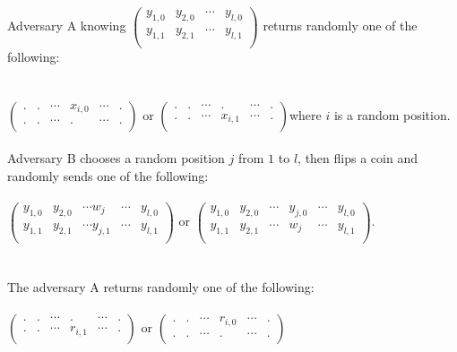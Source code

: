 \documentclass[oneside,a4paper,12pt]{book}
\begin{document}
Adversary A knowing  $\begin{pmatrix}
  y_{1,0} & y_{2,0} & \cdots & y_{l,0} \\
  y_{1,1} & y_{2,1} & \cdots & y_{l,1} \\
\end{pmatrix}$ returns randomly one of the following:\\\\\\$\begin{pmatrix}
  . & . & \cdots & x_{i,0}& \cdots & . \\
  . & . & \cdots & . & \cdots & . \\
\end{pmatrix}$ or $\begin{pmatrix}
  . & . & \cdots & . & \cdots & . \\
  . & . & \cdots & x_{i,1}& \cdots & . \\
\end{pmatrix}$where $i$ is a random position.\\\\

Adversary B chooses a random position $j$ from $1$ to $l$, then flips a coin and randomly sends one of the following:\\\\ $\begin{pmatrix}
  y_{1,0} & y_{2,0} & \cdots w_j& \cdots& y_{l,0} \\
  y_{1,1} & y_{2,1} & \cdots y_{j,1}& \cdots& y_{l,1} \\
\end{pmatrix}$ or  $\begin{pmatrix}
  y_{1,0} & y_{2,0} & \cdots & y_{j,0} & \cdots& y_{l,0} \\
  y_{1,1} & y_{2,1} & \cdots & w_j & \cdots& y_{l,1} \\
\end{pmatrix}$.\\\\\\
The adversary A returns randomly one of the following:\\\\$\begin{pmatrix}
  . & . & \cdots & . & \cdots & . \\
  . & . & \cdots & r_{i,1}& \cdots & . \\
\end{pmatrix}$ or $\begin{pmatrix}
  . & . & \cdots & r_{i,0} & \cdots & . \\
  . & . & \cdots & .& \cdots & . \\
\end{pmatrix}$\\\\\\
\end{document}
